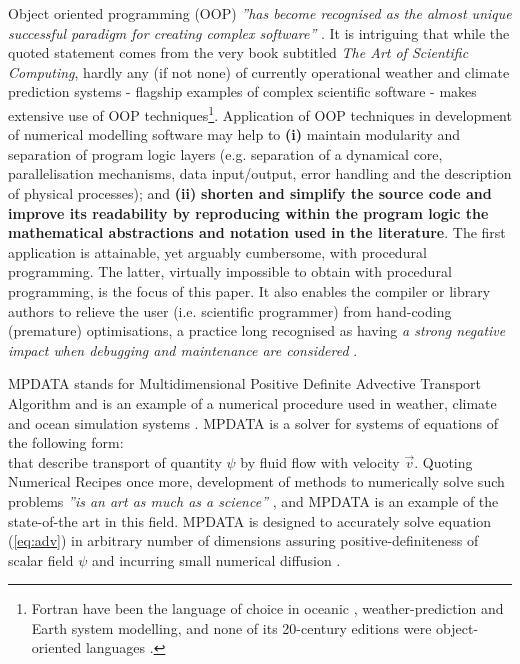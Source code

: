 \documentclass[final,5p,times,twocolumn]{elsarticle}
\begin{document}
  Object oriented programming (OOP) {\em ''has become recognised as the almost unique successful 
    paradigm for creating complex software''} \citep[][Sec.~1.3]{Press_et_al_2007}.
  It is intriguing that while the quoted statement comes from the very book subtitled 
   {\em The Art of Scientific Computing}, hardly any (if not none) of currently operational 
    weather and climate prediction systems - flagship examples of complex scientific software - 
    makes extensive use of OOP techniques\footnote{
  Fortran have been the language of choice in oceanic \citep{Griffies_et_al_2000}, 
    weather-prediction \citep{Sundberg_2009} and Earth system \citep{Legutke_2012} modelling, 
    and none of its 20-century editions were object-oriented languages \citep[see e.g.][for discussion]{Norton_et_al_2007}.}.
  Application of OOP techniques in development of numerical modelling software may help to
    {\bf (i)} maintain modularity and separation of program logic layers (e.g. separation of
      a dynamical core, parallelisation mechanisms, data input/output, error handling and
      the description of physical processes); and
    {\bf (ii)} {\bf shorten and simplify the source code and improve its readability by reproducing within 
      the program logic the mathematical abstractions and notation used in the literature}.
  The first application is attainable, yet arguably cumbersome, with procedural programming.
  The latter, virtually impossible to obtain with procedural programming, is the focus of this paper.
  It also enables the compiler or library authors to relieve the user (i.e. scientific programmer)
    from hand-coding (premature) optimisations, a practice long recognised as having {\em a strong negative impact when debugging
    and maintenance are considered} \citep{Knuth_1974}.

  MPDATA \citep{Smolarkiewicz_1984} stands for Multidimensional Positive Definite Advective Transport Algorithm and is
    an example of a numerical procedure used in weather, climate and ocean simulation systems
    \citep[e.g.][respectively]{Ziemianski_et_al_2011,Abiodun_et_al_2011,Ezer_et_al_2002}.
  MPDATA is a solver for systems of equations of the following form:
  \begin{equation}\label{eq:adv}
    
  \end{equation}
  that describe transport of quantity $\psi$ by fluid flow with velocity $\vec{v}$.
  Quoting Numerical Recipes once more, development of methods to numerically solve such problems 
    {\em ''is an art as much as a science''} \citep[][Sec.~20.1]{Press_et_al_2007},
    and MPDATA is an example of the state-of-the art in this field.
  MPDATA is designed to accurately solve equation (\ref{eq:adv}) in arbitrary
    number of dimensions assuring positive-definiteness of scalar field $\psi$ 
    and incurring small numerical diffusion
    \citep[see][for a recent review of MPDATA-based techniques]{Smolarkiewicz_2006}.
\end{document}
